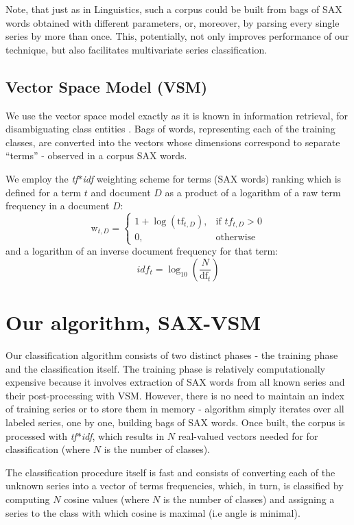\documentclass{llncs}
\begin{document}
Note, that just as in Linguistics, such a corpus could be built from bags of SAX words obtained with
different parameters, or, moreover, by parsing every single series by more than once. This,
potentially, not only improves performance of our technique, but also facilitates multivariate
series classification.

\subsection{Vector Space Model (VSM)}
We use the vector space model exactly as it is known in information retrieval, for
disambiguating class entities \cite{salton}. Bags of words, representing each of the training
classes, are converted into the vectors whose dimensions correspond to separate “terms” - observed
in a corpus SAX words. 

We employ the \textit{tf$\ast$idf} weighting scheme for terms (SAX words) ranking 
which is defined for a term $t$ and document $D$ 
as a product of a logarithm of a raw term frequency in a document $D$:
\begin{equation}
 \mbox{w}_{t, D} =  \begin{cases} 1 + \log(\mbox{tf}_{t,D}), & \mbox{if } tf_{t,D}>0  \\ 0, & \mbox{otherwise } \end{cases}
\end{equation} 
and a logarithm of an inverse document frequency for that term:
\begin{equation}
 idf_{t} =  \log_{10}(\frac{N}{\mbox{df}_{t}})
\end{equation} 

\section{Our algorithm, SAX-VSM}
Our classification algorithm consists of two distinct phases - the training phase and the
classification itself. The training phase is relatively computationally expensive because it
involves extraction of SAX words from all known series and their post-processing with VSM.
However, there is no need to maintain an index of training series or to store them in memory -
algorithm simply iterates over all labeled series, one by one, building bags of SAX words.
Once built, the corpus is processed with \textit{tf$\ast$idf}, which results in $N$
real-valued vectors needed for for classification (where $N$ is the number of classes).

The classification procedure itself is fast and consists of converting each of the unknown series
into a vector of terms frequencies, which, in turn, is classified by computing $N$ cosine values
(where $N$ is the number of classes) and assigning a series to the class with which cosine is
maximal (i.e angle is minimal).
\end{document}
